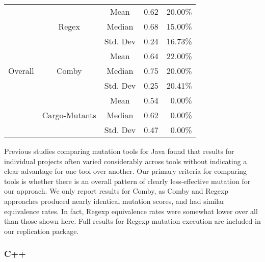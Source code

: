 \documentclass[sigconf,review, anonymous]{acmart}
\begin{document}
{\begin{table}[htbp]
{\begin{tabular}{|c|c|r|r|r|r|}
\multirow{9}{*}{Overall} & \multirow{3}{*}{Regex} & \multicolumn{2}{c|}{Mean} & 0.62  & 20.00\%\\\cline{3-6}
    &   &  \multicolumn{2}{c|}{Median} & 0.68 & 15.00\%\\\cline{3-6}
    &   &  \multicolumn{2}{c|}{Std. Dev} & 0.24 & 16.73\% \\\cline{2-6}

 & \multirow{3}{*}{Comby} & \multicolumn{2}{c|}{Mean} & 0.64 & 22.00\%\\\cline{3-6}
    &   &  \multicolumn{2}{c|}{Median} & 0.75 & 20.00\% \\\cline{3-6}
    &   &  \multicolumn{2}{c|}{Std. Dev} & 0.25 & 20.41\% \\\cline{2-6}

 & \multirow{3}{*}{Cargo-Mutants} & \multicolumn{2}{c|}{Mean} & 0.54 & 0.00\%\\\cline{3-6}
    &   &  \multicolumn{2}{c|}{Median} & 0.62 & 0.00\% \\\cline{3-6}
    &   &  \multicolumn{2}{c|}{Std. Dev} & 0.47 & 0.00\%\\ \hline
    
    
\end{tabular}
}
\end{table}

Previous studies comparing mutation tools for Java
\cite{MajorPIT,gopinath2017does,CommACMJavaTool} found that results
for individual projects often varied considerably across tools without
indicating a clear advantage for one tool over another.  Our primary
criteria for comparing tools is whether there is an overall pattern of
clearly less-effective mutation for our approach.  We only report
results for Comby, as Comby and Regexp approaches produced nearly
identical mutation scores, and had similar equivalence rates.  In
fact, Regexp equivalence rates were somewhat lower over all than those
shown here.  Full results for Regexp mutation execution are included
in our replication package.

\subsubsection{C++}

}
\end{document}
